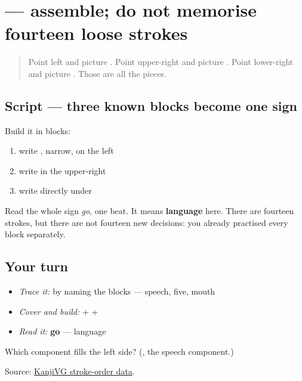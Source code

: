 \section[\texorpdfstring{\ja{語} (go)}{語 (go)}]{ — assemble; do not memorise fourteen loose strokes}

\label{lesson:JA-W05-go-kanji}



\begin{quote}
Point left and picture . Point upper-right and picture . Point lower-right and picture . Those are all the pieces.
\end{quote}

\subsection*{Script — three known blocks become one sign}

\begin{quote}
\end{quote}

Build it in blocks:

\begin{enumerate}
\raggedright
  \item write , narrow, on the left
  \item write  in the upper-right
  \item write  directly under 
\end{enumerate}

Read the whole sign \emph{go}, one beat. It means \textbf{language} here. There are fourteen strokes, but there are not fourteen new decisions: you already practised every block separately.

\subsection*{Your turn}
\begin{itemize}
\raggedright
  \item \emph{Trace it:}  by naming the blocks — speech, five, mouth
  \item \emph{Cover and build:}  +  + 
  \item \emph{Read it:} \textbf{go} — language
\end{itemize}

\begin{tcolorbox}[breakable,colback=teal!4,colframe=teal!35!black,title={Before you move on}]
Which component fills the left side? (\textbf{}, the speech component.)

Source: \href{https://kanjivg.tagaini.net/kanjivg/kanji/08a9e.html}{KanjiVG stroke-order data}.
\end{tcolorbox}
